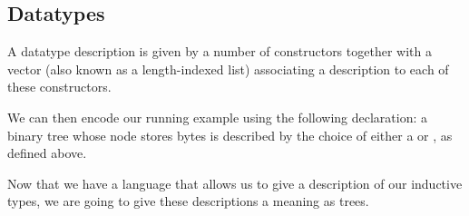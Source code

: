 

\subsection{Datatypes}

A datatype description is given by a number of constructors together with
a vector (also known as a length-indexed list) associating a description
to each of these constructors.


We can then encode our running example using the following 
declaration: a binary tree whose node stores bytes is described by the choice
of either a  or , as defined above.


Now that we have a language that allows us to give a description of our
inductive types, we are going to give these descriptions a meaning as trees.
